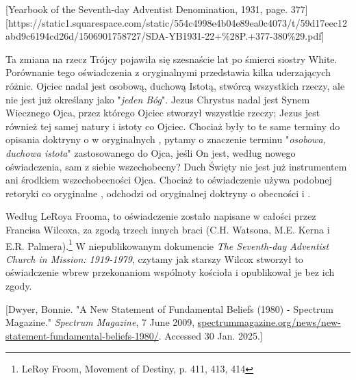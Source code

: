 [Yearbook of the Seventh-day Adventist Denomination, 1931, page. 377][https://static1.squarespace.com/static/554c4998e4b04e89ea0c4073/t/59d17eec12abd9c6194cd26d/1506901758727/SDA-YB1931-22+\%28P.+377-380\%29.pdf]

Ta zmiana na rzecz Trójcy pojawiła się szesnaście lat po śmierci siostry White. Porównanie tego oświadczenia z oryginalnymi  przedstawia kilka uderzających różnic. Ojciec nadal jest osobową, duchową Istotą, stwórcą wszystkich rzeczy, ale nie jest już określany jako "\textit{jeden Bóg}". Jezus Chrystus nadal jest Synem Wiecznego Ojca, przez którego Ojciec stworzył wszystkie rzeczy; Jezus jest również tej samej natury i istoty co Ojciec. Chociaż były to te same terminy do opisania doktryny o  w oryginalnych , pytamy o znaczenie terminu "\textit{osobowa, duchowa istota}" zastosowanego do Ojca, jeśli On jest, według nowego oświadczenia, sam z siebie wszechobecny? Duch Święty nie jest już instrumentem ani środkiem wszechobecności Ojca. Chociaż to oświadczenie używa podobnej retoryki co oryginalne , odchodzi od oryginalnej doktryny o obecności i .

Według LeRoya Frooma, to oświadczenie zostało napisane w całości przez Francisa Wilcoxa, za zgodą trzech innych braci (C.H. Watsona, M.E. Kerna i E.R. Palmera).\footnote{LeRoy Froom, Movement of Destiny, p. 411, 413, 414} W niepublikowanym dokumencie \textit{The Seventh-day Adventist Church in Mission: 1919-1979}, czytamy jak starszy Wilcox stworzył to oświadczenie wbrew przekonaniom wspólnoty kościoła i opublikował je bez ich zgody.

[Dwyer, Bonnie. "A New Statement of Fundamental Beliefs (1980) - Spectrum Magazine." \textit{Spectrum Magazine}, 7 June 2009, \href{https://spectrummagazine.org/news/new-statement-fundamental-beliefs-1980/}{spectrummagazine.org/news/new-statement-fundamental-beliefs-1980/}. Accessed 30 Jan. 2025.]

